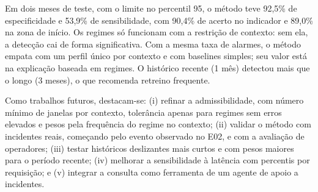 \documentclass[sigconf,nonacm]{acmart}
\begin{document}
Em dois meses de teste, com o limite no percentil 95, o método teve 92,5\% de especificidade e 53,9\% de sensibilidade, com 90,4\% de acerto no indicador e 89,0\% na zona de início. Os regimes só funcionam com a restrição de contexto: sem ela, a detecção cai de forma significativa. Com a mesma taxa de alarmes, o método empata com um perfil único por contexto e com baselines simples; seu valor está na explicação baseada em regimes. O histórico recente (1 mês) detectou mais que o longo (3 meses), o que recomenda retreino frequente.

Como trabalhos futuros, destacam-se: (i) refinar a admissibilidade, com número mínimo de janelas por contexto, tolerância apenas para regimes sem erros elevados e pesos pela frequência do regime no contexto; (ii) validar o método com incidentes reais, começando pelo evento observado no E02, e com a avaliação de operadores; (iii) testar históricos deslizantes mais curtos e com pesos maiores para o período recente; (iv) melhorar a sensibilidade à latência com percentis por requisição; e (v) integrar a consulta como ferramenta de um agente de apoio a incidentes.



\end{document}
